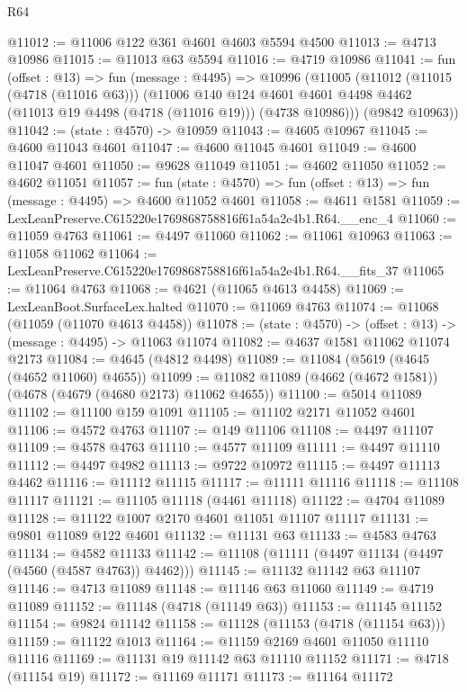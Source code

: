 \begin{lexlean}{R64}
\begin{coremodule}
@11012 := @11006 @122 @361 @4601 @4603 @5594 @4500
@11013 := @4713 @10986
@11015 := @11013 @63 @5594
@11016 := @4719 @10986
@11041 := fun (offset : @13) =>
  fun (message : @4495) =>
  @10996
    (@11005
      (@11012
        (@11015 (@4718 (@11016 @63)))
        (@11006
          @140
          @124
          @4601
          @4601
          @4498
          @4462
          (@11013 @19 @4498 (@4718 (@11016 @19)))
          (@4738 @10986)))
      (@9842 @10963))
@11042 := (state : @4570) -> @10959
@11043 := @4605 @10967
@11045 := @4600 @11043 @4601
@11047 := @4600 @11045 @4601
@11049 := @4600 @11047 @4601
@11050 := @9628 @11049
@11051 := @4602 @11050
@11052 := @4602 @11051
@11057 := fun (state : @4570) => fun (offset : @13) => fun (message : @4495) => @4600 @11052 @4601
@11058 := @4611 @1581
@11059 := LexLeanPreserve.C615220e1769868758816f61a54a2e4b1.R64.__enc_4
@11060 := @11059 @4763
@11061 := @4497 @11060
@11062 := @11061 @10963
@11063 := @11058 @11062
@11064 := LexLeanPreserve.C615220e1769868758816f61a54a2e4b1.R64.__fits_37
@11065 := @11064 @4763
@11068 := @4621 (@11065 @4613 @4458)
@11069 := LexLeanBoot.SurfaceLex.halted
@11070 := @11069 @4763
@11074 := @11068 (@11059 (@11070 @4613 @4458))
@11078 := (state : @4570) -> (offset : @13) -> (message : @4495) -> @11063 @11074
@11082 := @4637 @1581 @11062 @11074 @2173
@11084 := @4645 (@4812 @4498)
@11089 := @11084 (@5619 (@4645 (@4652 @11060) @4655))
@11099 := @11082 @11089 (@4662 (@4672 @1581)) (@4678 (@4679 (@4680 @2173) @11062 @4655))
@11100 := @5014 @11089
@11102 := @11100 @159 @1091
@11105 := @11102 @2171 @11052 @4601
@11106 := @4572 @4763
@11107 := @149 @11106
@11108 := @4497 @11107
@11109 := @4578 @4763
@11110 := @4577 @11109
@11111 := @4497 @11110
@11112 := @4497 @4982
@11113 := @9722 @10972
@11115 := @4497 @11113 @4462
@11116 := @11112 @11115
@11117 := @11111 @11116
@11118 := @11108 @11117
@11121 := @11105 @11118 (@4461 @11118)
@11122 := @4704 @11089
@11128 := @11122 @1007 @2170 @4601 @11051 @11107 @11117
@11131 := @9801 @11089 @122 @4601
@11132 := @11131 @63
@11133 := @4583 @4763
@11134 := @4582 @11133
@11142 := @11108 (@11111 (@4497 @11134 (@4497 (@4560 (@4587 @4763)) @4462)))
@11145 := @11132 @11142 @63 @11107
@11146 := @4713 @11089
@11148 := @11146 @63 @11060
@11149 := @4719 @11089
@11152 := @11148 (@4718 (@11149 @63))
@11153 := @11145 @11152
@11154 := @9824 @11142
@11158 := @11128 (@11153 (@4718 (@11154 @63)))
@11159 := @11122 @1013
@11164 := @11159 @2169 @4601 @11050 @11110 @11116
@11169 := @11131 @19 @11142 @63 @11110 @11152
@11171 := @4718 (@11154 @19)
@11172 := @11169 @11171
@11173 := @11164 @11172

\end{coremodule}
\end{lexlean}
